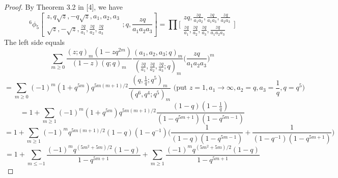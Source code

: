 \documentclass[10pt,reqno]{amsart}
\begin{document}
\begin{proof}
By Theorem 3.2 in [4], we have
\begin{equation}
    ^6\phi_5\left[\begin{array}{c}
             z, q\sqrt z,-q\sqrt z,a_1,a_2,a_3 \\
             \sqrt z,-\sqrt z,\displaystyle\frac{zq}{a_1},\displaystyle\frac{zq}{a_2},\displaystyle\frac{zq}{a_3}
    \end{array}
;q,\displaystyle\frac{zq}{a_1a_2a_3}\right]=\displaystyle\prod\Bigg[\begin{array}{c}
             zq, \displaystyle\frac{zq}{a_1a_2},\displaystyle\frac{zq}{a_1a_3},\displaystyle\frac{zq}{a_2a_3} \\
             \displaystyle\frac{zq}{a_1},\displaystyle\frac{zq}{a_2},\displaystyle\frac{zq}{a_3},\displaystyle\frac{zq}{a_1a_2a_3}
    \end{array}
    \Bigg]
\end{equation}
The left side equals 
\begin{equation*}
\displaystyle\sum_{m\geq 0} \displaystyle\frac{(z;q)_{m}(1-zq^{2m})}{(1-z)(q;q)_m}\displaystyle\frac{(a_1,a_2,a_3;q)_m}{(\displaystyle\frac{zq}{a_1},\displaystyle\frac{zq}{a_2},\displaystyle\frac{zq}{a_3};q)_m}\Bigg(\displaystyle\frac{zq}{a_1a_2a_3}\Bigg)^m 
\end{equation*}
\begin{equation*}
=\displaystyle\sum_{m\geq 0}(-1)^m(1+q^{5m})q^{5m(m+1)/2}\displaystyle\frac{(q,\displaystyle\frac{1}{q};q^5)_m}{(q^6,q^4;q^5)_m} \text{  (put  } z=1, a_1\rightarrow\infty, a_2=q,a_3=\displaystyle\frac{1}{q},q=q^5)
\end{equation*}
\begin{equation*}
=1+\displaystyle\sum_{m\geq 1}(-1)^m(1+q^{5m})q^{5m(m+1)/2}\displaystyle\frac{(1-q)(1-\displaystyle\frac{1}{q})}{(1-q^{5m+1})(1-q^{5m-1})}
\end{equation*}
\begin{equation*}
=1+\displaystyle\sum_{m\geq 1}(-1)^mq^{5m(m+1)/2}(1-q)(1-q^{-1})\Bigg(\displaystyle\frac{1}{(1-q)(1-q^{5m-1})}+\displaystyle\frac{1}{(1-q^{-1})(1-q^{5m+1})}\Bigg) 
\end{equation*}
\begin{equation*}
=1+\displaystyle\sum_{m\leq -1}\displaystyle\frac{(-1)^mq^{(5m^2+5m)/2}(1-q)}{1-q^{5m+1}}+\displaystyle\sum_{m\geq 1}\displaystyle\frac{(-1)^mq^{(5m^2+5m)/2}(1-q)}{1-q^{5m+1}}
\end{equation*}
\begin{equation*}

\end{equation*}
\end{proof}
\end{document}
